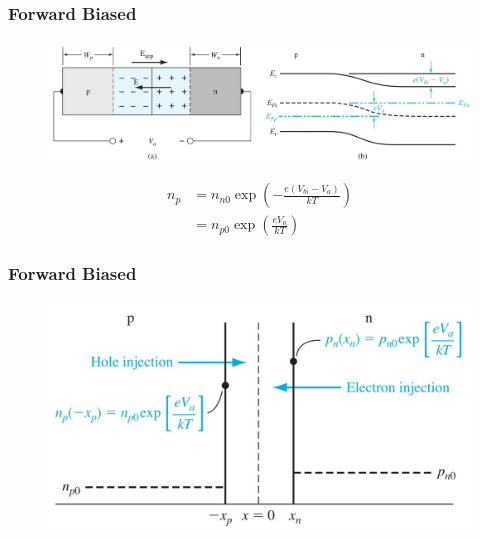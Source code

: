 \documentclass{beamer}
\begin{document}
    \begin{frame} \frametitle{Forward Biased}
        \begin{figure}[H]
            \centering
            \includegraphics[width=0.9\linewidth]{Forward-biased-equation.jpg}
            \label{fig:Forward-biased-equation.jpg}
        \end{figure}
        \begin{equation*}
            \begin{aligned}
                n_p &= n_{n0} \exp\left( -\frac{e (V_{bi} - V_a)}{kT}  \right) \\
                &= n_{p0} \exp\left( \frac{eV_a}{kT}  \right)
            \end{aligned}
        \end{equation*}
    \end{frame}
    \begin{frame} \frametitle{Forward Biased}
        \begin{figure}[H]
            \centering
            \includegraphics[width=0.8\linewidth]{Forward-biased-edge-concentration.jpg}
            \label{fig:Forward-biased-edge-concentration.jpg}
        \end{figure}
    \end{frame}
\end{document}
